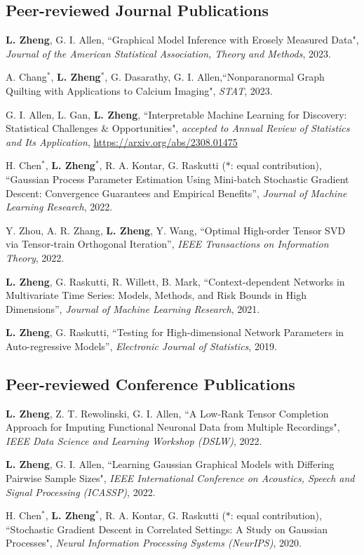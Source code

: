\documentclass[letterpaper,11pt]{article}
\begin{document}
	\subsection*{Peer-reviewed Journal Publications}
	\begin{etaremune}[start=10]
		\item {\bf L. Zheng}, G. I. Allen, ``Graphical Model Inference with Erosely Measured Data", {\em Journal of the American Statistical Association, Theory and Methods}, 2023.
		\item  A. Chang$^{*}$, {\bf L. Zheng}$^{*}$, G. Dasarathy, G. I. Allen,``Nonparanormal Graph Quilting with Applications to Calcium Imaging", {\em STAT}, 2023.
		\item G. I. Allen, L. Gan, {\bf L. Zheng}, ``Interpretable Machine Learning for Discovery: Statistical Challenges \& Opportunities", {\em accepted to Annual Review of Statistics and Its Application}, \href{https://arxiv.org/abs/2308.01475}{https://arxiv.org/abs/2308.01475}
		\item H. Chen$^{*}$, {\bf L. Zheng}$^{*}$, R. A. Kontar, G. Raskutti ($*$: equal contribution), ``Gaussian Process Parameter Estimation Using Mini-batch Stochastic Gradient Descent: Convergence Guarantees and Empirical Benefits'', {\em Journal of Machine Learning Research}, 2022.
		\item Y. Zhou, A. R. Zhang, {\bf L. Zheng}, Y. Wang, ``Optimal High-order Tensor SVD via Tensor-train Orthogonal
		Iteration'', {\em  IEEE Transactions on Information Theory}, 2022.
		\item {\bf L. Zheng}, G. Raskutti, R. Willett, B. Mark, ``Context-dependent Networks in Multivariate Time Series: Models, Methods, and Risk Bounds in High Dimensions'', {\em Journal of Machine Learning Research}, 2021.
		\item {\bf L. Zheng}, G. Raskutti, ``Testing for High-dimensional Network Parameters in Auto-regressive Models'', {\em Electronic Journal of Statistics}, 2019.
	\end{etaremune}
	\subsection*{Peer-reviewed Conference Publications}
\begin{etaremune}[start=3]
	\item {\bf L. Zheng}, Z. T. Rewolinski, G. I. Allen, ``A Low-Rank Tensor Completion Approach for Imputing Functional Neuronal Data from Multiple Recordings", {\em IEEE Data Science and Learning Workshop (DSLW)}, 2022.
	\item {\bf L. Zheng}, G. I. Allen, ``Learning Gaussian Graphical Models with Differing Pairwise Sample Sizes", {\em IEEE International Conference on Acoustics, Speech and Signal Processing (ICASSP)}, 2022.
	\item  H. Chen$^{*}$, {\bf L. Zheng}$^{*}$, R. A. Kontar, G. Raskutti ($*$: equal contribution), ``Stochastic Gradient Descent in Correlated Settings: A Study on Gaussian Processes", {\em Neural Information Processing Systems (NeurIPS)}, 2020.
\end{etaremune}
\end{document}
